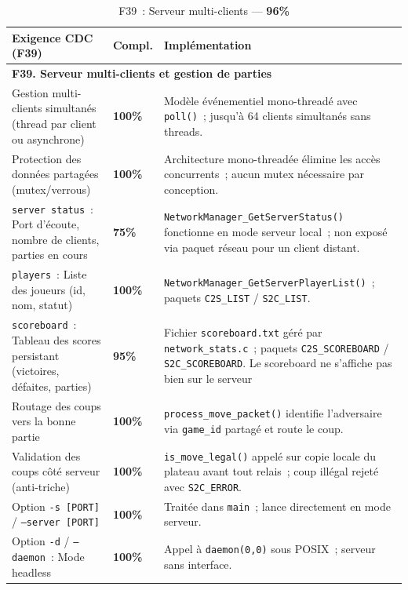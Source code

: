 \documentclass[a4paper]{article}
\begin{document}
 
\begin{table}[H]
\centering
\renewcommand{\arraystretch}{1.4}
\begin{tabular}{|p{6cm}|p{1.5cm}|p{8cm}|}
\hline
\textbf{Exigence CDC (F39)} & \textbf{Compl.} & \textbf{Implémentation} \\
\hline
\multicolumn{3}{|l|}{\textbf{F39. Serveur multi-clients et gestion de parties}} \\
\hline
Gestion multi-clients simultanés (thread par client ou asynchrone)
& \textbf{100\%}
& Modèle événementiel mono-threadé avec \texttt{poll()}~; jusqu'à 64 clients simultanés sans threads. \\
\hline
Protection des données partagées (mutex/verrous)
& \textbf{100\%}
& Architecture mono-threadée élimine les accès concurrents~; aucun mutex nécessaire par conception. \\
\hline
\texttt{server status}~: Port d'écoute, nombre de clients, parties en cours
& \textbf{75\%}
& \texttt{NetworkManager\_GetServerStatus()} fonctionne en mode serveur local~; non exposé via paquet réseau pour un client distant. \\
\hline
\texttt{players}~: Liste des joueurs (id, nom, statut)
& \textbf{100\%}
& \texttt{NetworkManager\_GetServerPlayerList()}~; paquets \texttt{C2S\_LIST} / \texttt{S2C\_LIST}. \\
\hline
\texttt{scoreboard}~: Tableau des scores persistant (victoires, défaites, parties)
& \textbf{95\%}
& Fichier \texttt{scoreboard.txt} géré par \texttt{network\_stats.c}~; paquets \texttt{C2S\_SCOREBOARD} / \texttt{S2C\_SCOREBOARD}. Le scoreboard ne s'affiche pas bien sur le serveur \\
\hline
Routage des coups vers la bonne partie
& \textbf{100\%}
& \texttt{process\_move\_packet()} identifie l'adversaire via \texttt{game\_id} partagé et route le coup. \\
\hline
Validation des coups côté serveur (anti-triche)
& \textbf{100\%}
& \texttt{is\_move\_legal()} appelé sur copie locale du plateau avant tout relais~; coup illégal rejeté avec \texttt{S2C\_ERROR}. \\
\hline
Option \texttt{-s [PORT]} / \texttt{--server [PORT]}
& \textbf{100\%}
& Traitée dans \texttt{main}~; lance directement en mode serveur. \\
\hline
Option \texttt{-d} / \texttt{--daemon}~: Mode headless
& \textbf{100\%}
& Appel à \texttt{daemon(0,0)} sous POSIX~; serveur sans interface. \\
\hline
\end{tabular}
\caption{F39~: Serveur multi-clients --- \textbf{96\%}}
\label{tab:f39}
\end{table}
 
\end{document}
